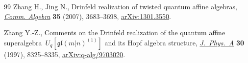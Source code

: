\begin{thebibliography}{99}
Zhang H., Jing N., Drinfeld realization of twisted quantum affine algebras,
 \href{https://doi.org/10.1080/00927870701404713}{\textit{Comm. Algebra}} \textbf{35} (2007), 3683--3698, \href{https://arxiv.org/abs/1301.3550}{arXiv:1301.3550}.

Zhang Y.-Z., Comments on the {D}rinfeld realization of the quantum affine
 superalgebra~{$U_q[\mathfrak{gl}(m|n)^{(1)}]$} and its {H}opf
 algebra structure, \href{https://doi.org/10.1088/0305-4470/30/23/028}{\textit{J.~Phys.~A}} \textbf{30} (1997), 8325--8335,
 \href{https://arxiv.org/abs/q-alg/9703020}{arXiv:q-alg/9703020}.

\end{thebibliography}
